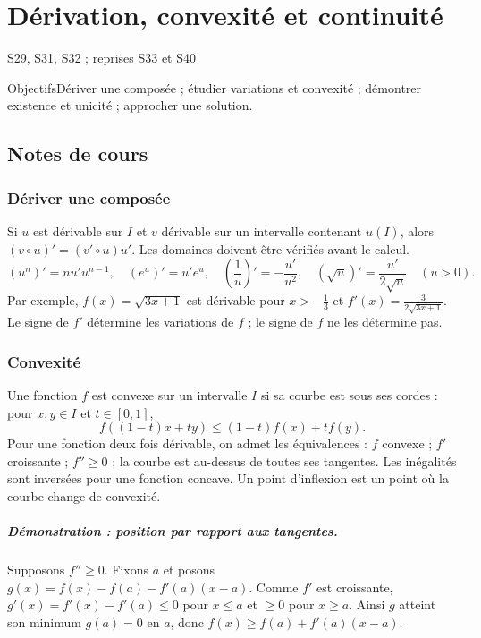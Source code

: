 \setcounter{chapter}{3}\chapter{Dérivation, convexité et continuité}\label{ch:4}

{\small\sffamily\color{teal}S29, S31, S32 ; reprises S33 et S40\par}

\begin{retenir}{Objectifs}Dériver une composée ; étudier variations et convexité ; démontrer existence et unicité ; approcher une solution.\end{retenir}

\section{Notes de cours}
\subsection{Dériver une composée}
Si $u$ est dérivable sur $I$ et $v$ dérivable sur un intervalle contenant $u(I)$, alors $(v\circ u)'=(v'\circ u)u'$. Les domaines doivent être vérifiés avant le calcul.
\[ (u^n)'=nu'u^{n-1},\quad(e^u)'=u'e^u,\quad
(\frac{1}{u})'=-\frac{u'}{u^2},\quad(\sqrt u)'=\frac{u'}{2\sqrt u}\quad(u>0).\]
Par exemple, $f(x)=\sqrt{3x+1}$ est dérivable pour $x>-\frac{1}{3}$ et $f'(x)=\frac{3}{2\sqrt{3x+1}}$. Le signe de $f'$ détermine les variations de $f$ ; le signe de $f$ ne les détermine pas.
\subsection{Convexité}
Une fonction $f$ est convexe sur un intervalle $I$ si sa courbe est sous ses cordes : pour $x,y\in I$ et $t\in[0,1]$,
\[f((1-t)x+ty)\le(1-t)f(x)+tf(y).\]
Pour une fonction deux fois dérivable, on admet les équivalences : $f$ convexe ; $f'$ croissante ; $f''\ge0$ ; la courbe est au-dessus de toutes ses tangentes. Les inégalités sont inversées pour une fonction concave. Un point d'inflexion est un point où la courbe change de convexité.
\paragraph{Démonstration : position par rapport aux tangentes.} Supposons $f''\ge0$. Fixons $a$ et posons $g(x)=f(x)-f(a)-f'(a)(x-a)$. Comme $f'$ est croissante, $g'(x)=f'(x)-f'(a)\le0$ pour $x\le a$ et $\ge0$ pour $x\ge a$. Ainsi $g$ atteint son minimum $g(a)=0$ en $a$, donc $f(x)\ge f(a)+f'(a)(x-a)$.
